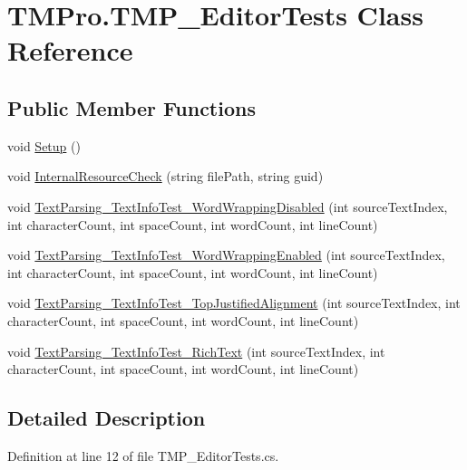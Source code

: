 \hypertarget{class_t_m_pro_1_1_t_m_p___editor_tests}{}\section{T\+M\+Pro.\+T\+M\+P\+\_\+\+Editor\+Tests Class Reference}
\label{class_t_m_pro_1_1_t_m_p___editor_tests}
\subsection*{Public Member Functions}
\begin{DoxyCompactItemize}
\item 
void \mbox{\hyperlink{class_t_m_pro_1_1_t_m_p___editor_tests_a930c700bbad10b0450f469e1f54fac98}{Setup}} ()
\item 
void \mbox{\hyperlink{class_t_m_pro_1_1_t_m_p___editor_tests_a0f1b1d346710a198165fb779e4bcb828}{Internal\+Resource\+Check}} (string file\+Path, string guid)
\item 
void \mbox{\hyperlink{class_t_m_pro_1_1_t_m_p___editor_tests_af019e99d147f82ded1b89035c53ddd4c}{Text\+Parsing\+\_\+\+Text\+Info\+Test\+\_\+\+Word\+Wrapping\+Disabled}} (int source\+Text\+Index, int character\+Count, int space\+Count, int word\+Count, int line\+Count)
\item 
void \mbox{\hyperlink{class_t_m_pro_1_1_t_m_p___editor_tests_a50f97174c61f451c71a1297edeed2ef9}{Text\+Parsing\+\_\+\+Text\+Info\+Test\+\_\+\+Word\+Wrapping\+Enabled}} (int source\+Text\+Index, int character\+Count, int space\+Count, int word\+Count, int line\+Count)
\item 
void \mbox{\hyperlink{class_t_m_pro_1_1_t_m_p___editor_tests_afca8b24280f94e1956a4808db574b4c3}{Text\+Parsing\+\_\+\+Text\+Info\+Test\+\_\+\+Top\+Justified\+Alignment}} (int source\+Text\+Index, int character\+Count, int space\+Count, int word\+Count, int line\+Count)
\item 
void \mbox{\hyperlink{class_t_m_pro_1_1_t_m_p___editor_tests_ac1ae601be4d67996320d9e920c29eb22}{Text\+Parsing\+\_\+\+Text\+Info\+Test\+\_\+\+Rich\+Text}} (int source\+Text\+Index, int character\+Count, int space\+Count, int word\+Count, int line\+Count)
\end{DoxyCompactItemize}


\subsection{Detailed Description}


Definition at line 12 of file T\+M\+P\+\_\+\+Editor\+Tests.\+cs.



